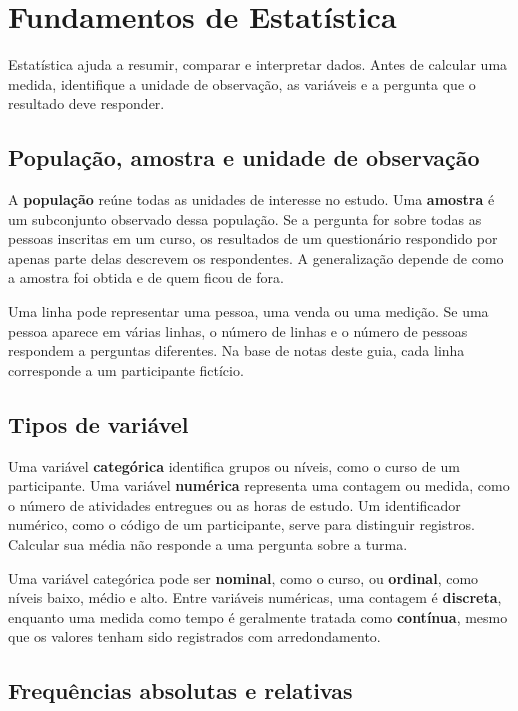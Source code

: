 \section{Fundamentos de Estatística}
\label{sec:estatistica}

Estatística ajuda a resumir, comparar e interpretar dados. Antes de calcular uma medida, identifique a unidade de observação, as variáveis e a pergunta que o resultado deve responder.

\subsection{População, amostra e unidade de observação}

A \textbf{população} reúne todas as unidades de interesse no estudo. Uma \textbf{amostra} é um subconjunto observado dessa população. Se a pergunta for sobre todas as pessoas inscritas em um curso, os resultados de um questionário respondido por apenas parte delas descrevem os respondentes. A generalização depende de como a amostra foi obtida e de quem ficou de fora.

Uma linha pode representar uma pessoa, uma venda ou uma medição. Se uma pessoa aparece em várias linhas, o número de linhas e o número de pessoas respondem a perguntas diferentes. Na base de notas deste guia, cada linha corresponde a um participante fictício.

\subsection{Tipos de variável}

Uma variável \textbf{categórica} identifica grupos ou níveis, como o curso de um participante. Uma variável \textbf{numérica} representa uma contagem ou medida, como o número de atividades entregues ou as horas de estudo. Um identificador numérico, como o código de um participante, serve para distinguir registros. Calcular sua média não responde a uma pergunta sobre a turma.

Uma variável categórica pode ser \textbf{nominal}, como o curso, ou \textbf{ordinal}, como níveis baixo, médio e alto. Entre variáveis numéricas, uma contagem é \textbf{discreta}, enquanto uma medida como tempo é geralmente tratada como \textbf{contínua}, mesmo que os valores tenham sido registrados com arredondamento.

\subsection{Frequências absolutas e relativas}

